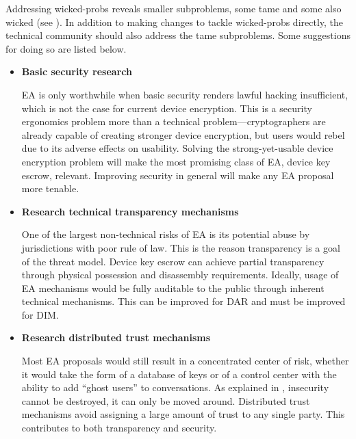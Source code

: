 Addressing \acp{wicked-prob} reveals smaller subproblems, some tame and some also wicked (see
). In addition to making changes to tackle \acp{wicked-prob} directly, the technical
community should also address the tame subproblems. Some suggestions for doing so are listed below.

\newcommand{\taskstart}[0]{\begin{itemize}}
\newcommand{\taskitem}[2]{ %
    \item \textbf{#1} \nopagebreak

    \vspace{0.5\baselineskip} \parbox{\linewidth}{#2} \vspace{0.5\baselineskip}
}
\newcommand{\taskend}{\end{itemize}}

\taskstart
    \taskitem{Basic security research}{

\ac{EA} is only worthwhile when basic security renders lawful hacking insufficient, which is not the case for current
device encryption. This is a security ergonomics problem more than a technical problem---cryptographers are already
capable of creating stronger device encryption, but users would rebel due to its adverse effects on usability. Solving
the strong-yet-usable device encryption problem will make the most promising class of \ac{EA}, device key escrow,
relevant. Improving security in general will make any \ac{EA} proposal more tenable.

}

    \taskitem{Research technical transparency mechanisms}{

One of the largest non-technical risks of \ac{EA} is its potential abuse by jurisdictions with poor rule of law. This is
the reason transparency is a goal of the threat model. Device key escrow can achieve partial transparency through
physical possession and disassembly requirements. Ideally, usage of \ac{EA} mechanisms would be fully auditable to the
public through inherent technical mechanisms. This can be improved for \acl{DAR} and must be improved for \acl{DIM}.

}

    \taskitem{Research distributed trust mechanisms}{

Most \ac{EA} proposals would still result in a concentrated center of risk, whether it would take the form of a database
of keys or of a control center with the ability to add ``ghost users'' to conversations. As explained in
\mysec{sec-premises}, insecurity cannot be destroyed, it can only be moved around. Distributed trust mechanisms avoid
assigning a large amount of trust to any single party. This contributes to both transparency and security.

}
\taskend


